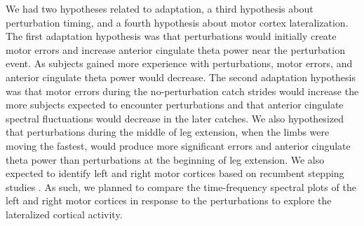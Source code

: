 \documentclass[shortpaper,twoside,web]{ieeecolor}
\begin{document}
We had two hypotheses related to adaptation, a third hypothesis about perturbation timing, and a fourth hypothesis about motor cortex lateralization. The first adaptation hypothesis was that perturbations would initially create motor errors and increase anterior cingulate theta power near the perturbation event. As subjects gained more experience with perturbations, motor errors, and anterior cingulate theta power would decrease. The second adaptation hypothesis was that motor errors during the no-perturbation catch strides would increase the more subjects expected to encounter perturbations and that anterior cingulate spectral fluctuations would decrease in the later catches. We also hypothesized that perturbations during the middle of leg extension, when the limbs were moving the fastest, would produce more significant errors and anterior cingulate theta power than perturbations at the beginning of leg extension. We also expected to identify left and right motor cortices based on recumbent stepping studies \cite{Jaeger2014-ao,Kline2016-ci}. As such, we planned to compare the time-frequency spectral plots of the left and right motor cortices in response to the perturbations to explore the lateralized cortical activity.
\end{document}
